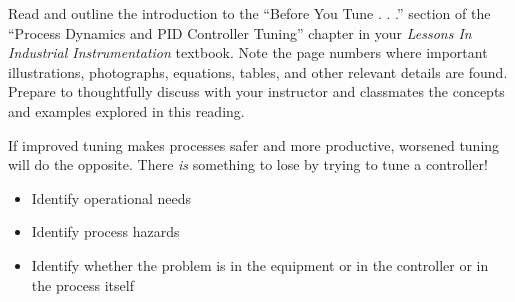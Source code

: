 

Read and outline the introduction to the ``Before You Tune . . .'' section of the ``Process Dynamics and PID Controller Tuning'' chapter in your {\it Lessons In Industrial Instrumentation} textbook.  Note the page numbers where important illustrations, photographs, equations, tables, and other relevant details are found.  Prepare to thoughtfully discuss with your instructor and classmates the concepts and examples explored in this reading.














If improved tuning makes processes safer and more productive, worsened tuning will do the opposite.  There {\it is} something to lose by trying to tune a controller!

\begin{itemize}
\item{} Identify operational needs
\item{} Identify process hazards
\item{} Identify whether the problem is in the equipment or in the controller or in the process itself
\end{itemize}







